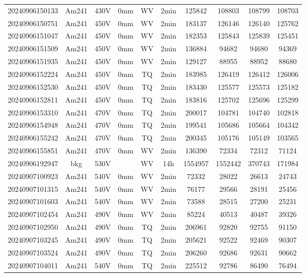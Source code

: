 \begin{center}
{\begin{longtable}{c c c c c c c c c c}
    20240906150133 & Am241 & 430V & 0mm & WV & 2min & 125842 & 108803 & 108799 & 108703 \\
    20240906150751 & Am241 & 450V & 0mm & WV & 2min & 183137 & 126146 & 126140 & 125762 \\
    20240906151047 & Am241 & 450V & 0mm & WV & 2min & 182353 & 125843 & 125839 & 125451 \\
    20240906151509 & Am241 & 450V & 0mm & WV & 2min & 136884 & 94682 & 94680 & 94369 \\
    20240906151935 & Am241 & 450V & 0mm & WV & 2min & 129127 & 88955 & 88952 & 88680 \\
    20240906152224 & Am241 & 450V & 0mm & TQ & 2min & 183985 & 126419 & 126412 & 126006 \\
    20240906152530 & Am241 & 450V & 0mm & TQ & 2min & 183430 & 125577 & 125573 & 125182 \\
    20240906152811 & Am241 & 450V & 0mm & TQ & 2min & 183816 & 125702 & 125696 & 125299 \\
    20240906153310 & Am241 & 470V & 0mm & TQ & 2min & 200017 & 104781 & 104740 & 102818 \\
    20240906154948 & Am241 & 470V & 0mm & TQ & 2min & 199541 & 105686 & 105664 & 104342 \\
    20240906155242 & Am241 & 470V & 0mm & TQ & 2min & 200345 & 105176 & 105149 & 103565 \\
    20240906155851 & Am241 & 470V & 0mm & WV & 2min & 136390 & 72334 & 72312 & 71124 \\
    20240906192947 & bkg & 530V &  & WV & 14h & 1554957 & 1552442 & 370743 & 171984 \\
    20240907100923 & Am241 & 540V & 0mm & WV & 2min & 72332 & 28022 & 26613 & 24743 \\
    20240907101315 & Am241 & 540V & 0mm & WV & 2min & 76177 & 29566 & 28191 & 25456 \\
    20240907101603 & Am241 & 540V & 0mm & WV & 2min & 73588 & 28515 & 27200 & 25231 \\
    20240907102454 & Am241 & 490V & 0mm & WV & 2min & 85224 & 40513 & 40487 & 39326 \\
    20240907102950 & Am241 & 490V & 0mm & TQ & 2min & 206961 & 92820 & 92755 & 91150 \\
    20240907103245 & Am241 & 490V & 0mm & TQ & 2min & 205621 & 92522 & 92469 & 90307 \\
    20240907103524 & Am241 & 490V & 0mm & TQ & 2min & 206260 & 92686 & 92631 & 90662 \\
    20240907104011 & Am241 & 540V & 0mm & TQ & 2min & 225512 & 92786 & 86490 & 76494 \\

\end{longtable}}
\end{center}
